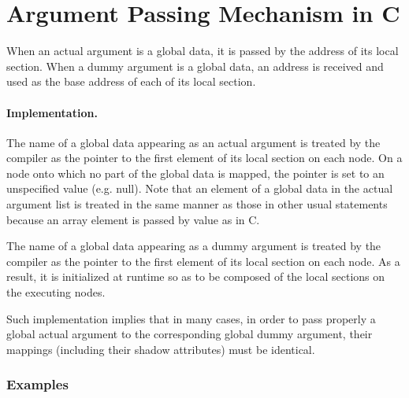 \section{Argument Passing Mechanism in {\XMP} C}

When an actual argument is a global data, it is passed by the address
of its local section.
%
When a dummy argument is a global data, an address is received and
used as the base address of each of its local section.


\paragraph*{Implementation.}

The name of a global data appearing as an actual argument is
treated by the {\XMP} compiler as the pointer to the first element of
its local section on each node.
%
On a node onto which no part of the global data is mapped, the pointer
is set to an unspecified value (e.g. null).
%
Note that an element of a global data in the actual argument list is
treated in the same manner as those in other usual statements because an
array element is passed by value as in C.

The name of a global data appearing as a dummy argument is
treated by the {\XMP} compiler as the pointer to the first element of
its local section on each node.
%
As a result, it is initialized at runtime so as to be
composed of the local sections on the executing nodes.

Such implementation implies that in many cases, in order to pass
properly a global actual argument to the corresponding global dummy 
argument, their mappings (including their shadow attributes) must be
identical.

\subsubsection*{Examples}

